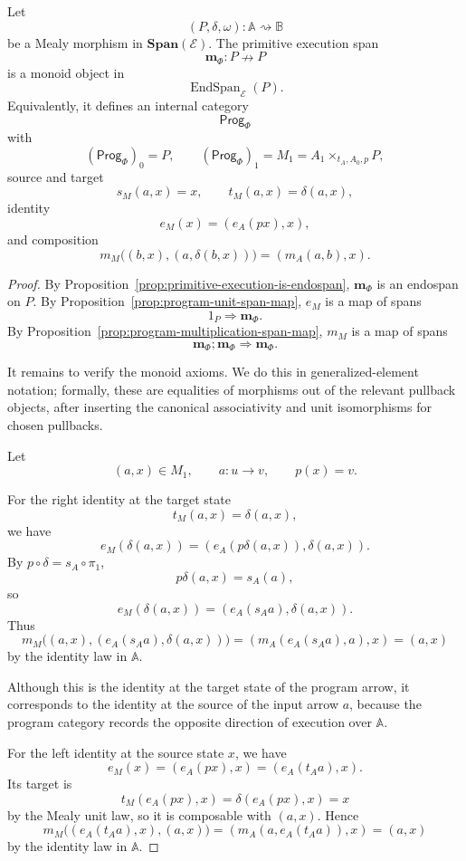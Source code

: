 \begin{theorem}
\label{thm:mealy-program-category}
Let
\[
(P,\delta,\omega):\mathbb A\rightsquigarrow\mathbb B
\]
be a Mealy morphism in \(\mathbf{Span}(\mathcal E)\). The primitive execution span
\[
\mathbf m_\Phi:P\nrightarrow P
\]
is a monoid object in
\[
\operatorname{EndSpan}_{\mathcal E}(P).
\]
Equivalently, it defines an internal category
\[
\mathsf{Prog}_\Phi
\]
with
\[
(\mathsf{Prog}_\Phi)_0=P,
\qquad
(\mathsf{Prog}_\Phi)_1=M_1=A_1\times_{t_A,A_0,p}P,
\]
source and target
\[
s_M(a,x)=x,
\qquad
t_M(a,x)=\delta(a,x),
\]
identity
\[
e_M(x)=(e_A(px),x),
\]
and composition
\[
m_M\bigl((b,x),(a,\delta(b,x))\bigr)
=
(m_A(a,b),x).
\]
\end{theorem}

\begin{proof}
By Proposition~\ref{prop:primitive-execution-is-endospan}, \(\mathbf m_\Phi\) is an endospan on \(P\). By Proposition~\ref{prop:program-unit-span-map}, \(e_M\) is a map of spans
\[
1_P\Rightarrow\mathbf m_\Phi.
\]
By Proposition~\ref{prop:program-multiplication-span-map}, \(m_M\) is a map of spans
\[
\mathbf m_\Phi;\mathbf m_\Phi\Rightarrow\mathbf m_\Phi.
\]

It remains to verify the monoid axioms. We do this in generalized-element notation; formally, these are equalities of morphisms out of the relevant pullback objects, after inserting the canonical associativity and unit isomorphisms for chosen pullbacks.

Let
\[
(a,x)\in M_1,
\qquad
a:u\to v,
\qquad
p(x)=v.
\]

For the right identity at the target state
\[
t_M(a,x)=\delta(a,x),
\]
we have
\[
e_M(\delta(a,x))
=
(e_A(p\delta(a,x)),\delta(a,x)).
\]
By \(p\circ\delta=s_A\circ\pi_1\),
\[
p\delta(a,x)=s_A(a),
\]
so
\[
e_M(\delta(a,x))
=
(e_A(s_Aa),\delta(a,x)).
\]
Thus
\[
m_M\bigl((a,x),(e_A(s_Aa),\delta(a,x))\bigr)
=
(m_A(e_A(s_Aa),a),x)
=
(a,x)
\]
by the identity law in \(\mathbb A\).

Although this is the identity at the target state of the program arrow, it corresponds to the identity at the source of the input arrow \(a\), because the program category records the opposite direction of execution over \(\mathbb A\).

For the left identity at the source state \(x\), we have
\[
e_M(x)=(e_A(px),x)=(e_A(t_Aa),x).
\]
Its target is
\[
t_M(e_A(px),x)
=
\delta(e_A(px),x)
=
x
\]
by the Mealy unit law, so it is composable with \((a,x)\). Hence
\[
m_M\bigl((e_A(t_Aa),x),(a,x)\bigr)
=
(m_A(a,e_A(t_Aa)),x)
=
(a,x)
\]
by the identity law in \(\mathbb A\).


\end{proof}
